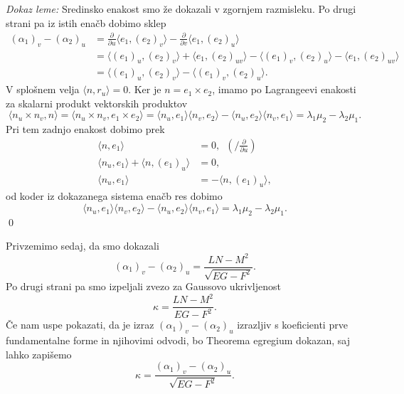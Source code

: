 \noindent
{\em Dokaz leme:\/}
Sredinsko enakost smo že dokazali v zgornjem razmisleku. Po drugi strani pa iz istih enačb dobimo sklep \begin{align*}
    (\alpha_1)_v - (\alpha_2)_u &= \frac{ \partial  }{ \partial u }  \langle e_1, (e_2)_v \rangle - \frac{ \partial  }{ \partial v}  \langle e_1, (e_2)_u \rangle \\
     &= \langle  (e_1)_u, (e_2)_v \rangle + \langle  e_1, (e_2)_{uv} \rangle  - \langle  (e_1)_v, (e_2)_u \rangle - \langle  e_1, (e_2)_{uv} \rangle \\
     &= \langle  (e_1)_u, (e_2)_v \rangle - \langle  (e_1)_v, (e_2)_u \rangle.
\end{align*}  
V splošnem velja $\langle n, r_u \rangle = 0$. Ker je $n = e_1 \times  e_2$, imamo po Lagrangeevi enakosti za skalarni produkt vektorskih produktov \begin{equation*}
\langle n_u \times n_v, n \rangle = \langle n_u \times  n_v, e_1 \times e_2 \rangle = \langle n_u, e_1 \rangle \langle n_v, e_2 \rangle - \langle n_u, e_2 \rangle \langle n_v, e_1 \rangle = \lambda_1 \mu_2 - \lambda_2 \mu_1. 
\end{equation*}  
Pri tem zadnjo enakost dobimo prek \begin{align*}
     \langle n, e_1 \rangle &= 0, \,\,\, \left(\bigg/ \frac{ \partial  }{ \partial u } \right) \\
     \langle n_u, e_1 \rangle + \langle  n, (e_1)_u \rangle  &= 0, \\
     \langle n_u, e_1 \rangle &= - \langle n, (e_1)_u \rangle,  
\end{align*}
od koder iz dokazanega sistema enačb res dobimo %
\begin{equation*}
    \langle n_u, e_1 \rangle \langle n_v, e_2 \rangle - \langle n_u, e_2 \rangle \langle n_v, e_1 \rangle = \lambda_1 \mu_2 - \lambda_2 \mu_1.
\end{equation*}  
\qed

Privzemimo sedaj, da smo dokazali \begin{equation*}
(\alpha_1)_v - (\alpha_2)_u = \frac{LN - M^2}{\sqrt{EG - F^2}}.  
\end{equation*}  
 Po drugi strani pa smo izpeljali zvezo za Gaussovo ukrivljenost \begin{equation*}
    \kappa = \frac{LN - M^2}{EG - F^2}.
 \end{equation*}  
Če nam uspe pokazati, da je izraz $(\alpha_1)_v - (\alpha_2)_u$ izrazljiv s koeficienti prve fundamentalne forme in njihovimi odvodi, bo Theorema egregium dokazan, saj lahko zapišemo \begin{equation*}
\kappa = \frac{(\alpha_1)_v - (\alpha_2)_u}{\sqrt{EG - F^2}}.
\end{equation*}  

